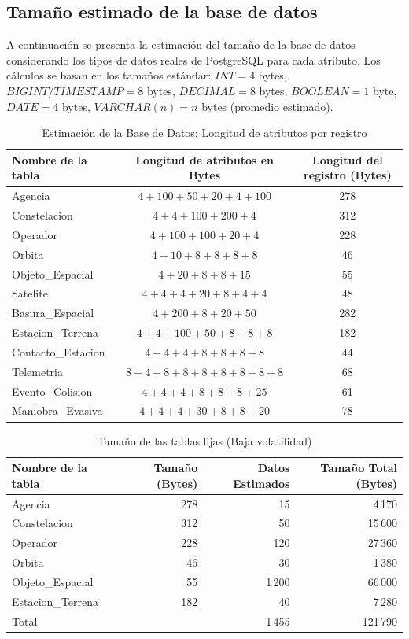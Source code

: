 \subsection{Tamaño estimado de la base de datos}

A continuación se presenta la estimación del tamaño de la base de datos considerando los tipos de datos reales de PostgreSQL para cada atributo. Los cálculos se basan en los tamaños estándar: $INT=4$ bytes, $BIGINT/TIMESTAMP=8$ bytes, $DECIMAL=8$ bytes, $BOOLEAN=1$ byte, $DATE=4$ bytes, $VARCHAR(n)=n$ bytes (promedio estimado).

\begin{table}[H]
\centering
\footnotesize
\begin{tabular}{lcc}
\toprule
\textbf{Nombre de la tabla} & \textbf{Longitud de atributos en Bytes} & \textbf{Longitud del registro (Bytes)} \\
\midrule
Agencia & $4+100+50+20+4+100$ & 278 \\
Constelacion & $4+4+100+200+4$ & 312 \\
Operador & $4+100+100+20+4$ & 228 \\
Orbita & $4+10+8+8+8+8$ & 46 \\
Objeto\_Espacial & $4+20+8+8+15$ & 55 \\
Satelite & $4+4+4+20+8+4+4$ & 48 \\
Basura\_Espacial & $4+200+8+20+50$ & 282 \\
Estacion\_Terrena & $4+4+100+50+8+8+8$ & 182 \\
Contacto\_Estacion & $4+4+4+8+8+8+8$ & 44 \\
Telemetria & $8+4+8+8+8+8+8+8+8$ & 68 \\
Evento\_Colision & $4+4+4+8+8+8+25$ & 61 \\
Maniobra\_Evasiva & $4+4+4+30+8+8+20$ & 78 \\
\bottomrule
\end{tabular}
\caption{Estimación de la Base de Datos: Longitud de atributos por registro}
\end{table}

\begin{table}[H]
\centering
\footnotesize
\begin{tabular}{lrrr}
\toprule
\textbf{Nombre de la tabla} & \textbf{Tamaño (Bytes)} & \textbf{Datos Estimados} & \textbf{Tamaño Total (Bytes)} \\
\midrule
Agencia & 278 & 15 & 4\,170 \\
Constelacion & 312 & 50 & 15\,600 \\
Operador & 228 & 120 & 27\,360 \\
Orbita & 46 & 30 & 1\,380 \\
Objeto\_Espacial & 55 & 1\,200 & 66\,000 \\
Estacion\_Terrena & 182 & 40 & 7\,280 \\
\midrule
Total & & 1\,455 & 121\,790 \\
\bottomrule
\end{tabular}
\caption{Tamaño de las tablas fijas (Baja volatilidad)}
\end{table}

